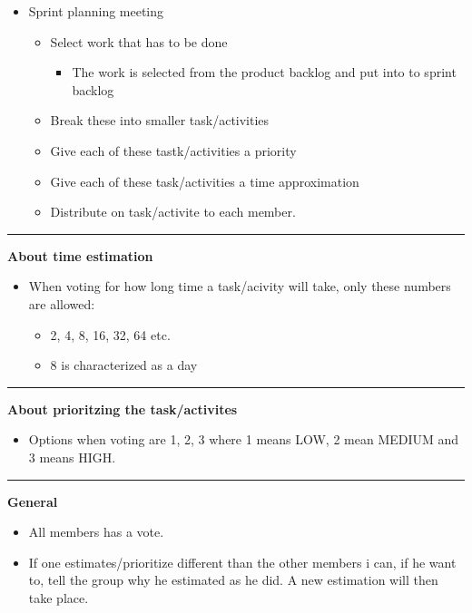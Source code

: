 \begin{framed}
\begin{itemize}
    \item Sprint planning meeting
    \begin{itemize}
        \item Select work that has to be done
        \begin{itemize}
            \item The work is selected from the product backlog and put into to
                sprint backlog
        \end{itemize}
        \item Break these into smaller task/activities
        \item Give each of these tastk/activities a priority 
        \item Give each of these task/activities a time approximation
        \item Distribute on task/activite to each member. 
    \end{itemize}
\end{itemize}

\hrule
\textbf{About time estimation}
\begin{itemize}
    \item When voting for how long time a task/acivity will take, only these numbers are allowed:
        \begin{itemize}
            \item 2, 4, 8, 16, 32, 64 etc.
            \item 8 is characterized as a day
        \end{itemize}
\end{itemize}

\hrule
\textbf{About prioritzing the task/activites}
\begin{itemize}
    \item Options when voting are 1, 2, 3 where 1 means LOW, 2 mean MEDIUM and
        3 means HIGH. 
\end{itemize}

\hrule
\textbf{General}
\begin{itemize}
    \item All members has a vote. 
    \item If one estimates/prioritize different than the other members i can,
        if he want to, tell the group why he estimated as
        he did. A new estimation will then take place.  
\end{itemize}
\end{framed}
